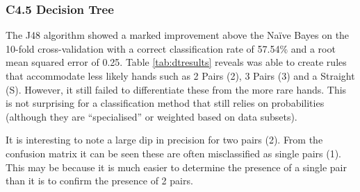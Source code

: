 \documentclass[11pt, a4paper]{article}
\begin{document}
\subsubsection*{C4.5 Decision Tree}

The J48 algorithm showed a marked improvement above the Na\"ive Bayes on the 10-fold cross-validation with a correct classification rate of 57.54\% and a root mean squared error of 0.25. Table \ref{tab:dtresults} reveals was able to create rules that accommodate less likely hands such as 2 Pairs (2), 3 Pairs (3) and a Straight (S). However, it still failed to differentiate these from the more rare hands. This is not surprising for a classification method that still relies on probabilities (although they are ``specialised'' or weighted based on data subsets). 

It is interesting to note a large dip in precision for two pairs (2). From the confusion matrix it can be seen these are often misclassified as single pairs (1). This may be because it is much easier to determine the presence of a single pair than it is to confirm the presence of 2 pairs.
\end{document}
